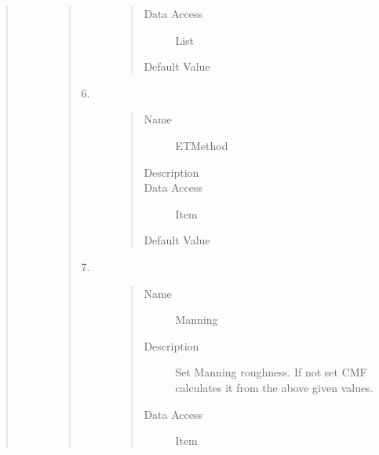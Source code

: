 \documentclass[letterpaper,10pt,english]{sphinxmanual}
\begin{document}
\begin{quote}
\begin{description}
\begin{quote}
\begin{description}
\begin{quote}
\begin{description}
\item[{Data Access}] \leavevmode
List

\item[{Default Value}] \leavevmode
{}

\end{description}\end{quote}

\item[{6.}] \leavevmode\begin{quote}\begin{description}
\item[{Name}] \leavevmode
ETMethod

\item[{Description}] \leavevmode
{}

\item[{Data Access}] \leavevmode
Item

\item[{Default Value}] \leavevmode
{}

\end{description}\end{quote}

\item[{7.}] \leavevmode\begin{quote}\begin{description}
\item[{Name}] \leavevmode
Manning

\item[{Description}] \leavevmode
Set Manning roughness. If not set CMF calculates it from the above given values.

\item[{Data Access}] \leavevmode
Item


\end{description}
\end{quote}
\end{description}
\end{quote}
\end{description}
\end{quote}
\end{document}
